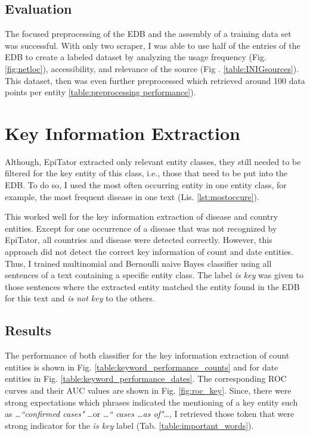 \subsection{Evaluation}
  The focused preprocessing of the EDB and the assembly of a training data set was successful.
  With only two scraper, I was able to use half of the entries of the EDB to create a labeled dataset by analyzing the usage frequency (Fig. \ref{fig:netloc}), accessibility, and relevance of the source (Fig . \ref{table:INIGsources}).
  This dataset, then was even further preprocessed which retrieved around 100 data points per entity \ref{table:preprocessing performance}).

\section{Key Information Extraction}
  Although, EpiTator extracted only relevant entity classes, they still needed to be filtered for the key entity of this class, i.e., those that need to be put into the EDB.
  To do so, I used the most often occurring entity in one entity class, for example, the most frequent disease in one text (Lis. \ref{lst:mostoccure}).

  This worked well for the key information extraction of disease and country entities.
  Except for one occurrence of a disease that was not recognized by EpiTator, all countries and disease were detected correctly.
  However, this approach did not detect the correct key information of count and date entities.
  Thus, I trained multinomial and Bernoulli naive Bayes classifier using all sentences of a text containing a specific entity class.
  The label \emph{is key} was given to those sentences where the extracted entity matched the entity found in the EDB for this text and \emph{is not key} to the others.

\subsection{Results}
  The performance of both classifier for the key information extraction of count entities is shown in Fig. \ref{table:keyword_performance_counts} and for date entities in Fig. \ref{table:keyword_performance_dates}. The corresponding ROC curves and their AUC values are shown in Fig. \ref{fig:roc_key}. Since, there were strong expectations which phrases indicated the mentioning of a key entity such as \dots \textit{``confirmed cases"} \dots or \dots \textit{`` cases \dots as of"}\dots, I retrieved those token that were strong indicator for the \textsl{is key} label (Tab. \ref{table:important_words}).

